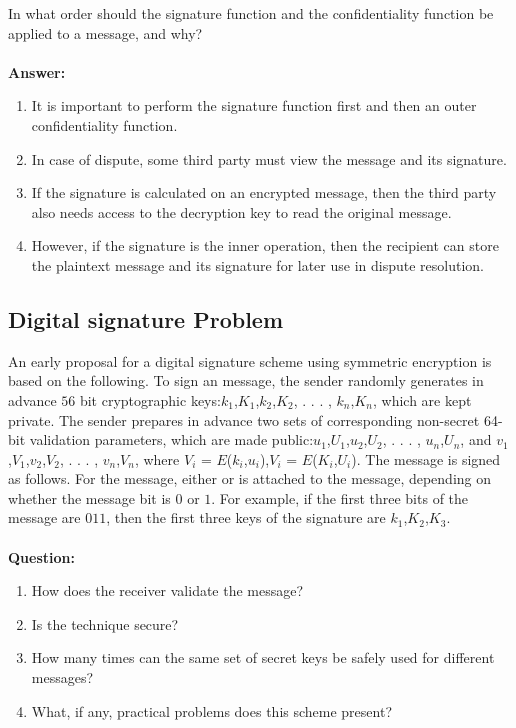 \documentclass[paper=a4, fontsize=11pt]{scrartcl} %
\numberwithin{equation}{section} %
\numberwithin{figure}{section} %
\numberwithin{table}{section} %
\begin{document}
In what order should the signature function and the confidentiality function be applied to a message, and why?
\\
\\
\textbf{Answer:}
\begin{enumerate}
\item It is important to perform the signature function first and then an outer confidentiality function.
\item In case of dispute, some third party must view the message and its signature.
\item If the signature is calculated on an encrypted message, then the third party also needs access to the decryption key to read the original message.
\item However, if the signature is the inner operation, then the recipient can store the plaintext message and its signature for later use in dispute resolution.
\end{enumerate}


\subsection{Digital signature Problem \uppercase\expandafter{}}

An early proposal for a digital signature scheme using symmetric encryption is based on the following. To sign an message, the sender randomly generates in advance $56$ bit cryptographic keys:$k$$_1$,$K$$_1$,$k$$_2$,$K$$_2$, . . . , $k$$_n$,$K$$_n$, which are kept private. The sender prepares in advance two sets of corresponding non-secret 64-bit validation parameters, which are made public:$u$$_1$,$U$$_1$,$u$$_2$,$U$$_2$, . . . , $u$$_n$,$U$$_n$, and $v$$_1$,$V$$_1$,$v$$_2$,$V$$_2$, . . . , $v$$_n$,$V$$_n$, where $V$$_i$ = $E$($k$$_i$,$u$$_i$),$V$$_i$ = $E$($K$$_i$,$U$$_i$). The message is signed as follows. For the message, either or is attached to the message, depending on whether the message bit is $0$ or $1$. For example, if the first three bits of the message are $011$, then the first three keys of the signature are $k$$_1$,$K$$_2$,$K$$_3$.
\\
\\
\textbf{Question:}
\begin{enumerate}
\item How does the receiver validate the message?
\item Is the technique secure?
\item How many times can the same set of secret keys be safely used for different messages?
\item What, if any, practical problems does this scheme present?
\end{enumerate}
\end{document}
